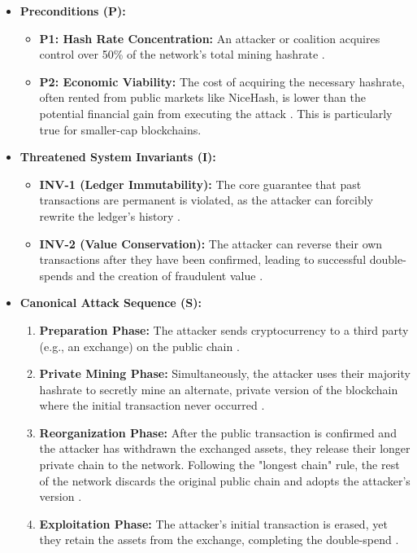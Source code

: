 \begin{itemize}
    \item \textbf{Preconditions (P):}
    \begin{itemize}
        \item \textbf{P1: Hash Rate Concentration:} An attacker or coalition acquires control over 50\% of the network's total mining hashrate \cite{wang2019, eyal2014}.
        \item \textbf{P2: Economic Viability:} The cost of acquiring the necessary hashrate, often rented from public markets like NiceHash, is lower than the potential financial gain from executing the attack \cite{casino2019}. This is particularly true for smaller-cap blockchains.
    \end{itemize}

    \item \textbf{Threatened System Invariants (I):}
    \begin{itemize}
        \item \textbf{INV-1 (Ledger Immutability):} The core guarantee that past transactions are permanent is violated, as the attacker can forcibly rewrite the ledger's history \cite{wang2019}.
        \item \textbf{INV-2 (Value Conservation):} The attacker can reverse their own transactions after they have been confirmed, leading to successful double-spends and the creation of fraudulent value \cite{eyal2014}.
    \end{itemize}

    \item \textbf{Canonical Attack Sequence (S):}
    \begin{enumerate}
        \item \textbf{Preparation Phase:} The attacker sends cryptocurrency to a third party (e.g., an exchange) on the public chain \cite{casino2019}.
        \item \textbf{Private Mining Phase:} Simultaneously, the attacker uses their majority hashrate to secretly mine an alternate, private version of the blockchain where the initial transaction never occurred \cite{eyal2014}.
        \item \textbf{Reorganization Phase:} After the public transaction is confirmed and the attacker has withdrawn the exchanged assets, they release their longer private chain to the network. Following the "longest chain" rule, the rest of the network discards the original public chain and adopts the attacker's version \cite{wang2019}.
        \item \textbf{Exploitation Phase:} The attacker's initial transaction is erased, yet they retain the assets from the exchange, completing the double-spend \cite{casino2019}.
    \end{enumerate}
\end{itemize}

